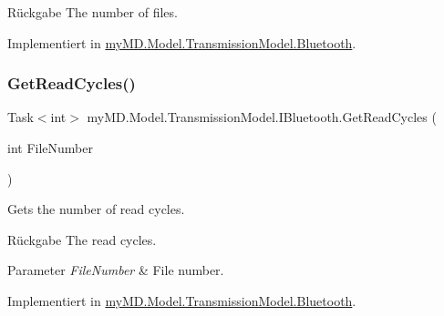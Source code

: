 \begin{DoxyReturn}{Rückgabe}
The number of files.
\end{DoxyReturn}


Implementiert in \mbox{\hyperlink{classmy_m_d_1_1_model_1_1_transmission_model_1_1_bluetooth_a277d879fffd698383319e8a7ccbd8a76}{my\+M\+D.\+Model.\+Transmission\+Model.\+Bluetooth}}.

\mbox{\label{interfacemy_m_d_1_1_model_1_1_transmission_model_1_1_i_bluetooth_a4101fa321005412173aa2676f29a4239}} 
\subsubsection{\texorpdfstring{Get\+Read\+Cycles()}{GetReadCycles()}}
{\footnotesize\ttfamily Task$<$int$>$ my\+M\+D.\+Model.\+Transmission\+Model.\+I\+Bluetooth.\+Get\+Read\+Cycles (\begin{DoxyParamCaption}\item[{int}]{File\+Number }\end{DoxyParamCaption})}



Gets the number of read cycles. 

\begin{DoxyReturn}{Rückgabe}
The read cycles.
\end{DoxyReturn}

\begin{DoxyParams}{Parameter}
{\em File\+Number} & File number.\\
\hline
\end{DoxyParams}


Implementiert in \mbox{\hyperlink{classmy_m_d_1_1_model_1_1_transmission_model_1_1_bluetooth_a9a37ecff2e6e2d6ab0de6f40b35e62d5}{my\+M\+D.\+Model.\+Transmission\+Model.\+Bluetooth}}.

\mbox{\label{interfacemy_m_d_1_1_model_1_1_transmission_model_1_1_i_bluetooth_a6e595ebbbd481bd57f2af7d8efa8a77f}} 
